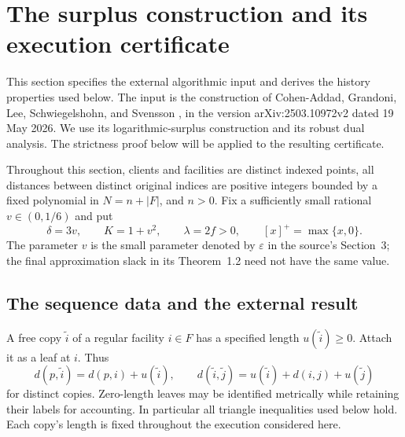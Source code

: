 \section{The surplus construction and its execution certificate}
\label{imp:section}

This section specifies the external algorithmic input and derives the
history properties used below.  The input is the construction of
Cohen-Addad, Grandoni, Lee, Schwiegelshohn, and Svensson
\cite{CGLSS2026}, in the version arXiv:2503.10972v2 dated 19 May 2026.
We use its logarithmic-surplus construction and its robust dual analysis.
The strictness proof below will be applied to the resulting certificate.

Throughout this section, clients and facilities are distinct indexed points,
all distances between distinct original indices are positive integers bounded by a fixed
polynomial in $N=n+|F|$, and $n>0$.  Fix a sufficiently small rational
$v\in(0,1/6)$ and put
\[
 \delta=3v,\qquad K=1+v^2,\qquad \lambda=2f>0,
 \qquad [x]^+=\max\{x,0\}.
\]
The parameter $v$ is the small parameter denoted by $\varepsilon$ in the
source's Section~3; the final approximation slack in its Theorem~1.2 need
not have the same value.

\subsection{The sequence data and the external result}

A free copy $\widetilde i$ of a regular facility $i\in F$ has a specified
length $u(\widetilde i)\ge0$.  Attach it as a leaf at $i$.  Thus
\[
 d(p,\widetilde i)=d(p,i)+u(\widetilde i),\qquad
 d(\widetilde i,\widetilde j)
   =u(\widetilde i)+d(i,j)+u(\widetilde j)
\]
for distinct copies.  Zero-length leaves may be identified metrically
while retaining their labels for accounting.  In particular all triangle
inequalities used below hold.  Each copy's length is fixed throughout the
execution considered here.

